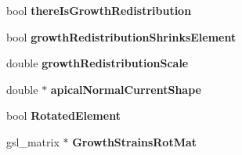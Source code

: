 \begin{DoxyCompactItemize}
\item 
\hypertarget{classShapeBase_afb4ab7a9dcb19f182cde416757397b7c}{}bool {\bfseries there\+Is\+Growth\+Redistribution}\label{classShapeBase_afb4ab7a9dcb19f182cde416757397b7c}

\item 
\hypertarget{classShapeBase_a7112715f6a436f2500793f67991b612c}{}bool {\bfseries growth\+Redistribution\+Shrinks\+Element}\label{classShapeBase_a7112715f6a436f2500793f67991b612c}

\item 
\hypertarget{classShapeBase_a0c7adb65c236a91a84acd9c1add5dc50}{}double {\bfseries growth\+Redistribution\+Scale}\label{classShapeBase_a0c7adb65c236a91a84acd9c1add5dc50}

\item 
\hypertarget{classShapeBase_af013a3968d145feecfdd925380f72b71}{}double $\ast$ {\bfseries apical\+Normal\+Current\+Shape}\label{classShapeBase_af013a3968d145feecfdd925380f72b71}

\item 
\hypertarget{classShapeBase_af64f900d51cec3e48a488fdd8a51eacf}{}bool {\bfseries Rotated\+Element}\label{classShapeBase_af64f900d51cec3e48a488fdd8a51eacf}

\item 
\hypertarget{classShapeBase_acc1408c3e89b91787fec7e913cac1f58}{}gsl\+\_\+matrix $\ast$ {\bfseries Growth\+Strains\+Rot\+Mat}\label{classShapeBase_acc1408c3e89b91787fec7e913cac1f58}

\end{DoxyCompactItemize}
